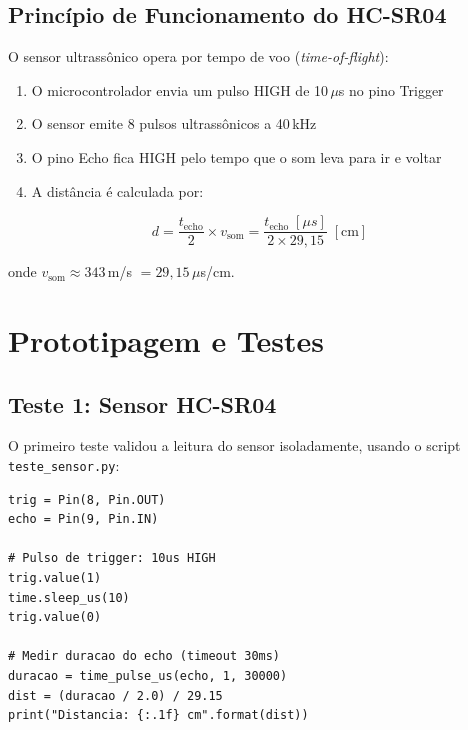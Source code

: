\documentclass[12pt, a4paper]{article}
\begin{document}
\subsection{Princípio de Funcionamento do HC-SR04}

O sensor ultrassônico opera por tempo de voo (\textit{time-of-flight}):

\begin{enumerate}
  \item O microcontrolador envia um pulso HIGH de 10\,$\mu$s no pino Trigger
  \item O sensor emite 8 pulsos ultrassônicos a 40\,kHz
  \item O pino Echo fica HIGH pelo tempo que o som leva para ir e voltar
  \item A distância é calculada por:
\end{enumerate}

\begin{equation}
  d = \frac{t_{\text{echo}}}{2} \times v_{\text{som}} = \frac{t_{\text{echo}} \; [\mu s]}{2 \times 29{,}15} \; [\text{cm}]
\end{equation}

onde $v_{\text{som}} \approx 343$\,m/s $= 29{,}15$\,$\mu$s/cm.


\section{Prototipagem e Testes}
\label{sec:prototipagem}

\subsection{Teste 1: Sensor HC-SR04}

O primeiro teste validou a leitura do sensor isoladamente, usando o script \texttt{teste\_sensor.py}:

\begin{lstlisting}[caption={Trecho do teste standalone do HC-SR04.}]
trig = Pin(8, Pin.OUT)
echo = Pin(9, Pin.IN)

# Pulso de trigger: 10us HIGH
trig.value(1)
time.sleep_us(10)
trig.value(0)

# Medir duracao do echo (timeout 30ms)
duracao = time_pulse_us(echo, 1, 30000)
dist = (duracao / 2.0) / 29.15
print("Distancia: {:.1f} cm".format(dist))
\end{lstlisting}
\end{document}
